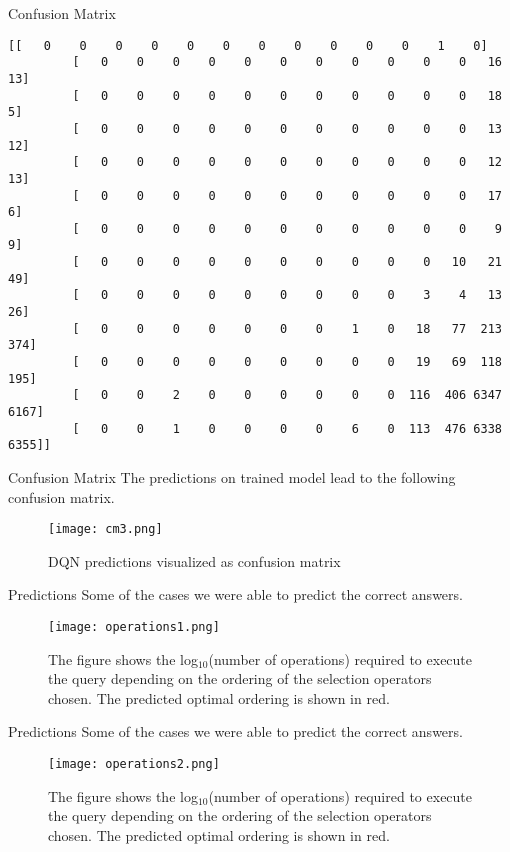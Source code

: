 \begin{frame}[fragile]{Confusion Matrix}
    \begin{lstlisting}[caption=Confusion matrix for DQN classificaiton, label={lst:confusion_matrix}]
        [[   0    0    0    0    0    0    0    0    0    0    0    1    0]
         [   0    0    0    0    0    0    0    0    0    0    0   16   13]
         [   0    0    0    0    0    0    0    0    0    0    0   18    5]
         [   0    0    0    0    0    0    0    0    0    0    0   13   12]
         [   0    0    0    0    0    0    0    0    0    0    0   12   13]
         [   0    0    0    0    0    0    0    0    0    0    0   17    6]
         [   0    0    0    0    0    0    0    0    0    0    0    9    9]
         [   0    0    0    0    0    0    0    0    0    0   10   21   49]
         [   0    0    0    0    0    0    0    0    0    3    4   13   26]
         [   0    0    0    0    0    0    0    1    0   18   77  213  374]
         [   0    0    0    0    0    0    0    0    0   19   69  118  195]
         [   0    0    2    0    0    0    0    0    0  116  406 6347 6167]
         [   0    0    1    0    0    0    0    6    0  113  476 6338 6355]]
    \end{lstlisting}
\end{frame}

\begin{frame}{Confusion Matrix}
    The predictions on trained model lead to the following confusion matrix.
    \begin{figure}
        \centering
        \texttt{[image: cm3.png]}\\
        \caption{DQN predictions visualized as confusion matrix}
        \label{fig:dqn_r2_1}
    \end{figure}
\end{frame}

\begin{frame}{Predictions}
    Some of the cases we were able to predict the correct answers.
    \begin{figure}
        \centering
        \texttt{[image: operations1.png]}\\
        \caption{The figure shows the log$_{10}$(number of operations) required to execute the query depending on the ordering of the selection operators chosen. The predicted optimal ordering is shown in red.}
        \label{fig:operations1}
    \end{figure}
\end{frame}

\begin{frame}{Predictions}
    Some of the cases we were able to predict the correct answers.
    \begin{figure}
        \centering
        \texttt{[image: operations2.png]}\\
        \caption{The figure shows the log$_{10}$(number of operations) required to execute the query depending on the ordering of the selection operators chosen. The predicted optimal ordering is shown in red.}
        \label{fig:operations2}
    \end{figure}
\end{frame}



